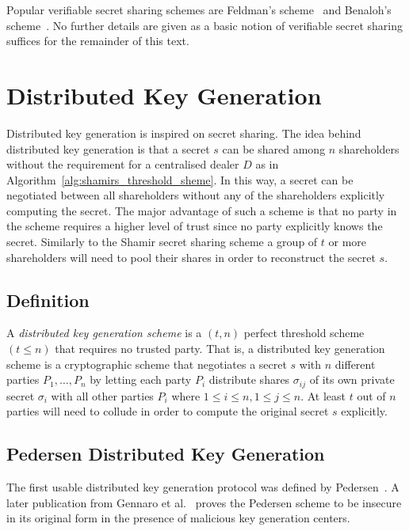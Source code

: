 Popular verifiable secret sharing schemes are Feldman's scheme~\cite{art:Feldman87} and Benaloh's scheme~\cite{art:Benaloh86a}. No further details are given as a basic notion of verifiable secret sharing suffices for the remainder of this text.

\section{Distributed Key Generation}
\label{sec:distributed_key_generation}
Distributed key generation is inspired on secret sharing. The idea behind distributed key generation is that a secret $s$ can be shared among $n$ shareholders without the requirement for a centralised dealer $D$ as in Algorithm~\ref{alg:shamirs_threshold_sheme}. In this way, a secret can be negotiated between all shareholders without any of the shareholders explicitly computing the secret. The major advantage of such a scheme is that no party in the scheme requires a higher level of trust since no party explicitly knows the secret. Similarly to the Shamir secret sharing scheme a group of $t$ or more shareholders will need to pool their shares in order to reconstruct the secret $s$.

\subsection{Definition}
\begin{defn}
\label{def:dkg_scheme}
 A \textit{distributed key generation scheme} is a $\left( t,n \right)$ perfect threshold scheme $\left( t \leq n \right)$ that requires no trusted party. That is, a distributed key generation scheme is a cryptographic scheme that negotiates a secret $s$ with $n$ different parties $P_1, \ldots, P_n$ by letting each party $P_i$ distribute shares $\sigma_{ij}$ of its own private secret $\sigma_i$ with all other parties $P_i$ where $1 \leq i \leq n, 1 \leq j \leq n$. At least $t$ out of $n$ parties will need to collude in order to compute the original secret $s$ explicitly.
\end{defn}

\subsection{Pedersen Distributed Key Generation}
The first usable distributed key generation protocol was defined by Pedersen~\cite{art:Pedersen91a}. A later publication from Gennaro et al.~\cite{art:GennaroJKR07} proves the Pedersen scheme to be insecure in its original form in the presence of malicious key generation centers.

